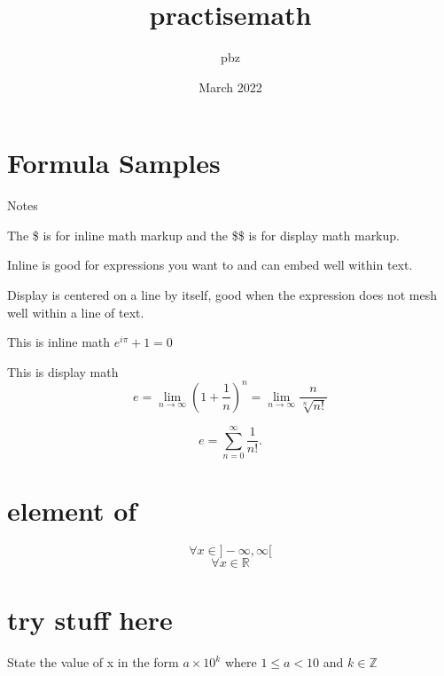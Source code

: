 \documentclass{article}
\title{practisemath}
\author{pbz }
\date{March 2022}
\begin{document}
\maketitle

\section{Formula Samples}

Notes

The \$ is for inline math markup and the \$\$ is for display math markup.

Inline is good for expressions you want to and can  embed well within text.

Display is centered on a line by itself, good when the expression does not
mesh well within a line of text.

This is inline math $e^{i\pi} + 1 =0$

This is display math $$ e = \lim_{n\to\infty} \left(1+\frac{1}{n}\right)^n
= \lim_{n\to\infty} \frac{n}{\sqrt[n]{n!}}$$

$$e=\sum_{n=0}^{\infty} \frac{1}{n!}.$$

\section{element of}

    $$ \forall x \in ] -\infty, \infty [ $$
    $$ \forall x \in \mathbb{R} $$
    
    
\section{try stuff here}
    
State the value of x in the form $a \times 10^{k}$  where $1 \leq a < 10$ and  $k \in \mathbb{Z}$    
    
\end{document}
